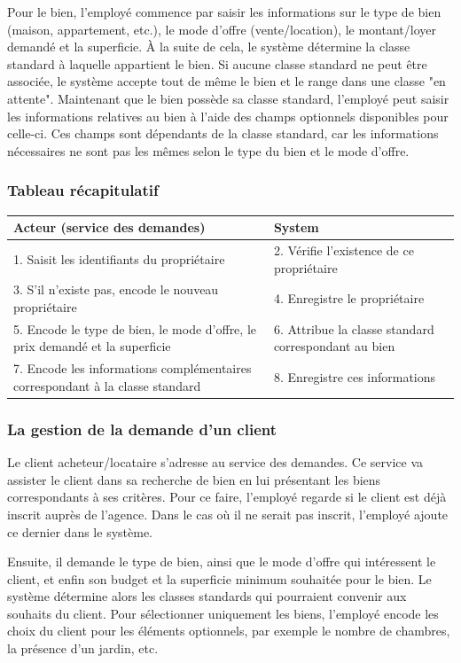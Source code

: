 Pour le bien, l'employé commence par saisir les informations sur le type de bien (maison, appartement, etc.), le mode d'offre (vente/location), le montant/loyer demandé et la superficie.
À la suite de cela, le système détermine la classe standard à laquelle appartient le bien.
Si aucune classe standard ne peut être associée, le système accepte tout de même le bien et le range dans une classe "en attente".
Maintenant que le bien possède sa classe standard, l'employé peut saisir les informations relatives au bien à l'aide des champs optionnels disponibles pour celle-ci.
Ces champs sont dépendants de la classe standard, car les informations nécessaires ne sont pas les mêmes selon le type du bien et le mode d'offre.

\subsubsection*{Tableau récapitulatif}
\begin{longtable}{|p{7.5cm}|p{7.5cm}|}
\hline
Acteur (service des demandes)& System\\
\hline
1. Saisit les identifiants du propriétaire & 2. Vérifie l'existence de ce propriétaire\\
3. S'il n'existe pas, encode le nouveau propriétaire & 4. Enregistre le propriétaire\\
5. Encode le type de bien, le mode d'offre, le prix demandé et la superficie & 6. Attribue la classe standard correspondant au bien\\
7. Encode les informations complémentaires correspondant à la classe standard & 8. Enregistre ces informations\\	
\hline
\end{longtable}
\subsubsection{La gestion de la demande d'un client}
Le client acheteur/locataire s'adresse au service des demandes.
Ce service va assister le client dans sa recherche de bien en lui présentant les biens correspondants à ses critères.
Pour ce faire, l'employé regarde si le client est déjà inscrit auprès de l'agence. Dans le cas où il ne serait pas inscrit, l'employé ajoute ce dernier dans le système.

Ensuite, il demande le type de bien, ainsi que le mode d'offre qui intéressent le client, et enfin son budget et la superficie minimum souhaitée pour le bien. Le système détermine alors les classes standards qui pourraient convenir aux souhaits du client.
Pour sélectionner uniquement les biens, l'employé encode les choix du client pour les éléments optionnels, par exemple le nombre de chambres, la présence d'un jardin, etc.

